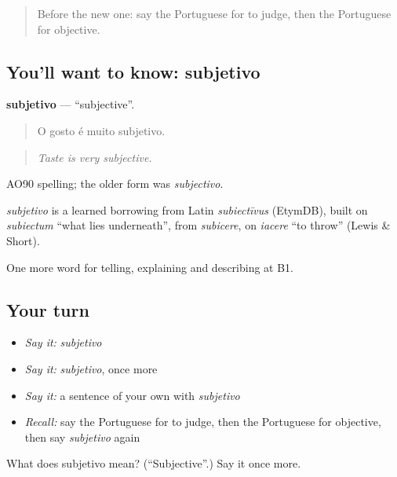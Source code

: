 \label{lesson:PT-C344-subjetivo}



\begin{quote}
Before the new one: say the Portuguese for to judge, then the Portuguese for objective.
\end{quote}

\subsection*{You'll want to know: subjetivo}
\textbf{subjetivo} — \textquotedblleft{}subjective\textquotedblright{}.

\begin{quote}
O gosto é muito subjetivo.
\end{quote}

\begin{quote}
\emph{Taste is very subjective.}
\end{quote}

AO90 spelling; the older form was \emph{subjectivo}.

\begin{cousinweb}
\emph{subjetivo} is a learned borrowing from Latin \emph{subiectīvus} (EtymDB), built on \emph{subiectum} \textquotedblleft{}what lies underneath\textquotedblright{}, from \emph{subicere}, on \emph{iacere} \textquotedblleft{}to throw\textquotedblright{} (Lewis \& Short).
\end{cousinweb}

\begin{grammarlens}[title={What you've built}]
One more word for telling, explaining and describing at B1.
\end{grammarlens}

\subsection*{Your turn}
\begin{itemize}
\raggedright
  \item \emph{Say it:} \emph{subjetivo}
  \item \emph{Say it:} \emph{subjetivo}, once more
  \item \emph{Say it:} a sentence of your own with \emph{subjetivo}
  \item \emph{Recall:} say the Portuguese for to judge, then the Portuguese for objective, then say \emph{subjetivo} again
\end{itemize}

\begin{tcolorbox}[breakable,colback=teal!4,colframe=teal!35!black,title={Before you move on}]
What does subjetivo mean? (\textquotedblleft{}Subjective\textquotedblright{}.) Say it once more.
\end{tcolorbox}

